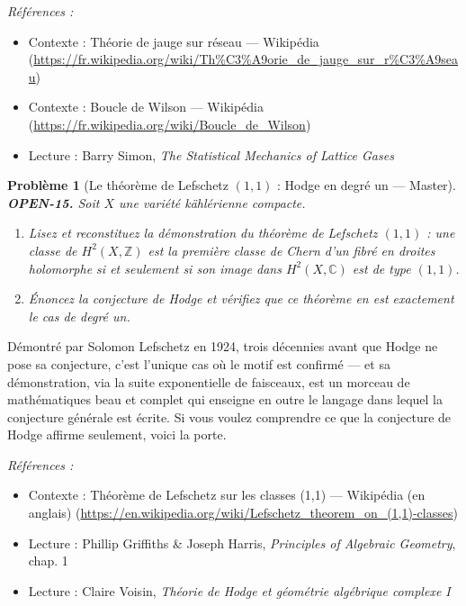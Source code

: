 \documentclass[11pt]{article}
\newtheorem{problem}{Problème}
\newenvironment{refs}{\par\small\noindent\emph{Références :}\begin{itemize}\setlength\itemsep{0pt}}{\end{itemize}\normalsize}
\begin{document}
\begin{refs}
\item Contexte : Théorie de jauge sur réseau --- Wikipédia (\url{https://fr.wikipedia.org/wiki/Th%C3%A9orie_de_jauge_sur_r%C3%A9seau})
\item Contexte : Boucle de Wilson --- Wikipédia (\url{https://fr.wikipedia.org/wiki/Boucle_de_Wilson})
\item Lecture : Barry Simon, \textit{The Statistical Mechanics of Lattice Gases}
\end{refs}

\bigskip

\begin{problem}[{Le théorème de Lefschetz $ (1,1) $ : Hodge en degré un --- Master}]
\textbf{OPEN-15.} Soit $ X $ une variété kählérienne compacte.
\begin{enumerate}
\item[(a)] Lisez et reconstituez la démonstration du théorème de Lefschetz $ (1,1) $ : une
classe de $ H^2(X, \mathbb{Z}) $ est la première classe de Chern d'un fibré en droites
holomorphe si et seulement si son image dans $ H^2(X, \mathbb{C}) $ est de type
$ (1,1) $.
\item[(b)] Énoncez la conjecture de Hodge et vérifiez que ce théorème en est exactement le cas
de degré un.
\end{enumerate}

\end{problem}

\noindent Démontré par Solomon Lefschetz en 1924, trois décennies avant que Hodge
ne pose sa conjecture, c'est l'unique cas où le motif est confirmé --- et sa démonstration,
via la suite exponentielle de faisceaux, est un morceau de mathématiques beau et complet
qui enseigne en outre le langage dans lequel la conjecture générale est écrite. Si vous
voulez comprendre ce que la conjecture de Hodge affirme seulement, voici la porte.

\begin{refs}
\item Contexte : Théorème de Lefschetz sur les classes (1,1) --- Wikipédia (en anglais) (\url{https://en.wikipedia.org/wiki/Lefschetz_theorem_on_(1,1)-classes})
\item Lecture : Phillip Griffiths \& Joseph Harris, \textit{Principles of Algebraic Geometry}, chap. 1
\item Lecture : Claire Voisin, \textit{Théorie de Hodge et géométrie algébrique complexe I}
\end{refs}
\end{document}
